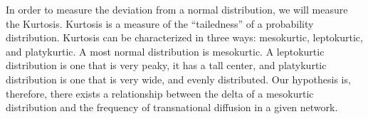 In order to measure the deviation from a normal distribution, we will
measure the Kurtosis. Kurtosis is a measure of the ``tailedness'' of a
probability distribution. Kurtosis can be characterized in three ways:
mesokurtic, leptokurtic, and platykurtic. A most normal distribution
is mesokurtic. A leptokurtic distribution is one that is very peaky,
it has a tall center, and platykurtic distribution is one that is very
wide, and evenly distributed. Our hypothesis is, therefore, there
exists a relationship between the delta of a mesokurtic distribution
and the frequency of transnational diffusion in a given network.
